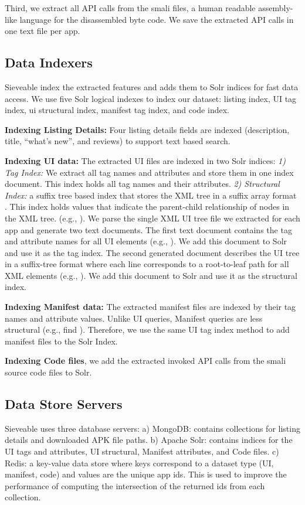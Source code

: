Third, we extract all API calls from the smali files, a human readable assembly-like language for the disassembled byte code.
We save the extracted API calls in one text file per app.

\subsection{Data Indexers}
Sieveable index the extracted features and adds them to Solr indices for fast data access. We use five Solr logical indexes to index our dataset: listing index, UI tag index, ui structural index, manifest tag index, and code index.

\textbf{Indexing Listing Details:} Four listing details fields are indexed (description, title, ``what's new'', and reviews) to support text based search.

\textbf{Indexing UI data:} The extracted UI files are indexed in two Solr indices: \textit{1) Tag Index:} We extract all tag names and attributes and store them in one index document.
This index holds all tag names and their attributes.
\textit{2) Structural Index:} a suffix tree based index that stores the XML tree in a suffix array format \cite{shasha_2002_atreegrep}.
This index holds values that indicate the parent-child relationship of nodes in the XML tree. (e.g., ).
We parse the single XML UI tree file we extracted for each app and generate two text documents. The first text document contains the tag and attribute names for all UI elements (e.g., ).
We add this document to Solr and use it as the tag index.
The second generated document describes the UI tree in a suffix-tree format where each line corresponds to a root-to-leaf path for all XML elements (e.g., ).
We add this document to Solr and use it as the structural index.

\textbf{Indexing Manifest data:} The extracted manifest files are indexed by their tag names and attribute values.
Unlike UI queries, Manifest queries are less structural (e.g., find ).
Therefore, we use the same UI tag index method to add manifest files to the Solr Index.

\textbf{Indexing Code files}, we add the extracted invoked API calls from the smali source code files to Solr.

\subsection{Data Store Servers}
Sieveable uses three database servers: 
a) MongoDB: contains collections for listing details and downloaded APK file paths.
b) Apache Solr: contains indices for the UI tags and attributes, UI structural, Manifest attributes, and Code files.
c) Redis: a key-value data store where keys correspond to a dataset type (UI, manifest, code) and values are the unique app ids.
This is used to improve the performance of computing the intersection of the returned ids from each collection.
